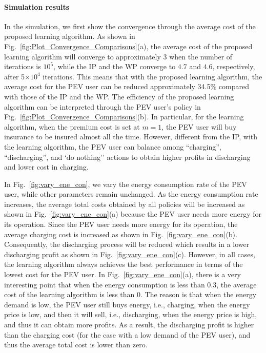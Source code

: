 \documentclass[twocolumn,10pt]{IEEEtran}
\begin{document}
\paragraph{Simulation results}

In the simulation, we first show the convergence through the average cost of the proposed learning algorithm. As shown in Fig.~\ref{fig:Plot_Convergence_Comparisons}(a), the average cost of the proposed learning algorithm will converge to approximately 3 when the number of iterations is $10^5$, while the IP and the WP converge to $4.7$ and $4.6$, respectively, after 5$\times 10^4$ iterations. This means that with the proposed learning algorithm, the average cost for the PEV user can be reduced approximately 34.5\% compared with those of the IP and the WP. The efficiency of the proposed learning algorithm can be interpreted through the PEV user's policy in Fig.~\ref{fig:Plot_Convergence_Comparisons}(b). In particular, for the learning algorithm, when the premium cost is set at $m=1$, the PEV user will buy insurance to be insured almost all the time. However, different from the IP, with the learning algorithm, the PEV user can balance among ``charging'', ``discharging'', and `do nothing'' actions to obtain higher profits in discharging and lower cost in charging.

In Fig.~\ref{fig:vary_ene_con}, we vary the energy consumption rate of the PEV user, while other parameters remain unchanged. As the energy consumption rate increases, the average total costs obtained by all policies will be increased as shown in Fig.~\ref{fig:vary_ene_con}(a) because the PEV user needs more energy for its operation. Since the PEV user needs more energy for its operation, the average charging cost is increased as shown in Fig.~\ref{fig:vary_ene_con}(b). Consequently, the discharging process will be reduced which results in a lower discharging profit as shown in Fig.~\ref{fig:vary_ene_con}(c). However, in all cases, the learning algorithm always achieves the best performance in terms of the lowest cost for the PEV user. In Fig.~\ref{fig:vary_ene_con}(a), there is a very interesting point that when the energy consumption is less than 0.3, the average cost of the learning algorithm is less than 0. The reason is that when the energy demand is low, the PEV user still buys energy, i.e., charging, when the energy price is low, and then it will sell, i.e., discharging, when the energy price is high, and thus it can obtain more profits. As a result, the discharging profit is higher than the charging cost (for the case with a low demand of the PEV user), and thus the average total cost is lower than zero. 
\end{document}
